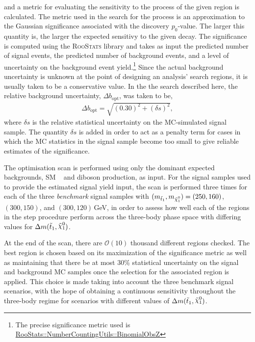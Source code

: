 and a metric for evaluating the sensitivity to the \bWN process of the given region
is calculated.
The metric used in the search for the \bWN process is an approximation to the Gaussian significance
associated with the discovery $p_0$-value.
The larger this quantity is, the larger the expected sensitivy to the given \bWN decay.
The significance is computed using the \textsc{RooStats} library and takes as input
the predicted number of signal events, the predicted number of background events,
and a level of uncertainty on the background event yield.\footnote{The precise
significance metric used is \href{https://root.cern.ch/doc/v606/namespaceRooStats_1_1NumberCountingUtils.html\#a4ac05df7796855dca2d8b24473bf7d4e}{RooStats::NumberCountingUtils::BinomialObsZ} 
}
Since the actual background uncertainty is unknown at the point of designing an analysis'
search regions, it is usually taken to be a conservative value.
In the the search described here, the relative background uncertainty, $\Delta b_{\text{opt}}$, was taken to be,
\begin{align*}
    \Delta b_{\text{opt}} = \sqrt{ (0.30)^2 + (\delta s)^2 },
\end{align*}
where $\delta s$ is the relative statistical uncertainty on the MC-simulated signal sample.
The quantity $\delta s$ is added in order to act as a penalty term for cases in which the
MC statistics in the signal sample become too small to give reliable estimates of the significance.

The optimisation scan is performed using only the dominant expected backgrounds, SM \ttbar~ and diboson production,
as input.
For the signal samples used to provide the estimated signal yield input,
the scan is performed three times for each of the three \textit{benchmark} signal samples with $\msn = (250, 160)$, $(300,150)$, and $(300,120)$\,GeV,
in order to assess how well each of the regions in the step procedure perform
across the three-body phase space with differing values for $\sdiff$.

At the end of the scan, there are $\mathcal{O}(10)$ thousand different regions checked.
The best region is chosen based on its maximization of the significance metric as well as
maintaining that there be at most 30\% statistical uncertainty on the signal and background MC samples
once the selection for the associated region is applied.
This choice is made taking into account the three benchmark \bWN signal scenarios, with the hope
of obtaining a continuous sensitivity throughout the three-body regime for scenarios
with different values of $\sdiff$.


